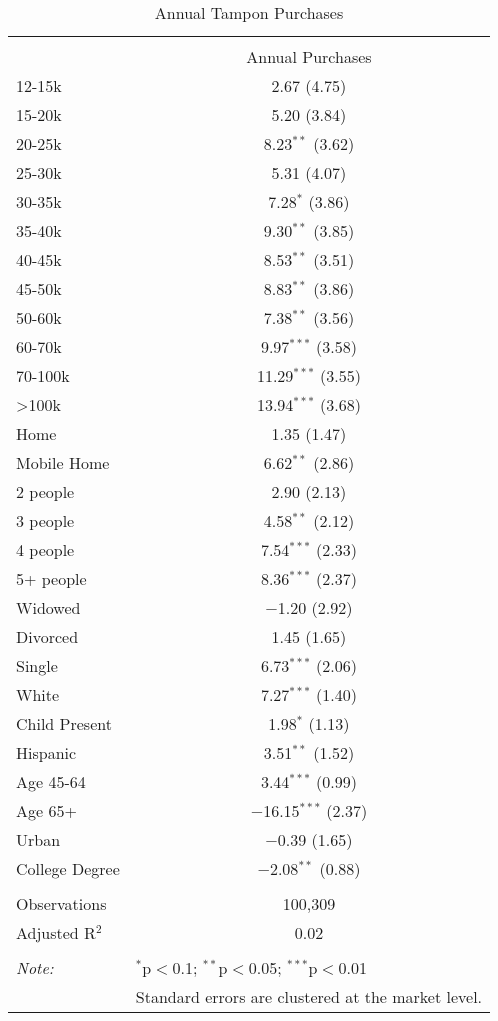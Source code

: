
\begin{table}[!htbp] \centering 
  \caption{Annual Tampon Purchases} 
  \label{tab:annualTampon} 
\begin{tabular}{@{\extracolsep{5pt}}lc} 
\\[-1.8ex]\hline 
\hline \\[-1.8ex] 
 & Annual Purchases \\ 
 12-15k & 2.67 (4.75) \\ 
  15-20k & 5.20 (3.84) \\ 
  20-25k & 8.23$^{**}$ (3.62) \\ 
  25-30k & 5.31 (4.07) \\ 
  30-35k & 7.28$^{*}$ (3.86) \\ 
  35-40k & 9.30$^{**}$ (3.85) \\ 
  40-45k & 8.53$^{**}$ (3.51) \\ 
  45-50k & 8.83$^{**}$ (3.86) \\ 
  50-60k & 7.38$^{**}$ (3.56) \\ 
  60-70k & 9.97$^{***}$ (3.58) \\ 
  70-100k & 11.29$^{***}$ (3.55) \\ 
  >100k & 13.94$^{***}$ (3.68) \\ 
  Home & 1.35 (1.47) \\ 
  Mobile Home & 6.62$^{**}$ (2.86) \\ 
  2 people & 2.90 (2.13) \\ 
  3 people & 4.58$^{**}$ (2.12) \\ 
  4 people & 7.54$^{***}$ (2.33) \\ 
  5+ people & 8.36$^{***}$ (2.37) \\ 
  Widowed & $-$1.20 (2.92) \\ 
  Divorced & 1.45 (1.65) \\ 
  Single & 6.73$^{***}$ (2.06) \\ 
  White & 7.27$^{***}$ (1.40) \\ 
  Child Present & 1.98$^{*}$ (1.13) \\ 
  Hispanic & 3.51$^{**}$ (1.52) \\ 
  Age 45-64 & 3.44$^{***}$ (0.99) \\ 
  Age 65+ & $-$16.15$^{***}$ (2.37) \\ 
  Urban & $-$0.39 (1.65) \\ 
  College Degree & $-$2.08$^{**}$ (0.88) \\ 
 \hline \\[-1.8ex] 
Observations & 100,309 \\ 
Adjusted R$^{2}$ & 0.02 \\ 
\hline 
\hline \\[-1.8ex] 
\textit{Note:}  & \multicolumn{1}{l}{$^{*}$p$<$0.1; $^{**}$p$<$0.05; $^{***}$p$<$0.01} \\ 
 & \multicolumn{1}{l}{Standard errors are clustered at the market level.} \\ 
\end{tabular} 
\end{table} 
